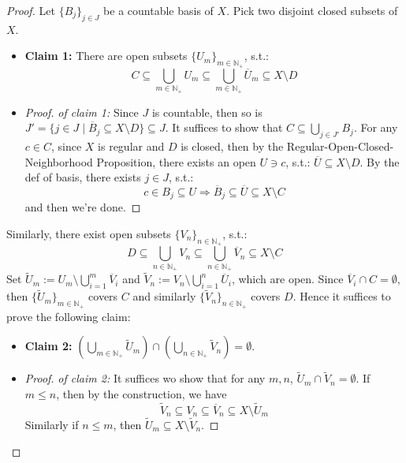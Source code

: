 \begin{proof}
    Let $\{B_j\}_{j \in J}$ be a countable basis of $X$. Pick two disjoint closed subsets of $X$.
    \begin{itemize}
        \item \textbf{Claim 1:} There are open subsets $\{U_m\}_{m \in \mathbb{N}_+}$, s.t.:
        $$C \subseteq \bigcup_{m \in \mathbb{N}_+} U_m \subseteq \bigcup_{m \in \mathbb{N}_+} \overline{U}_m \subseteq X \setminus D$$
        \item \begin{proof}
            \textit{of claim 1:} Since $J$ is countable, then so is $J'= \{j \in J \mid \overline{B}_j \subseteq X \setminus D\} \subseteq J$. It suffices to show that $C \subseteq \bigcup_{j \in J'} B_j$. For any $c \in C$, since $X$ is regular and $D$ is closed, then by the Regular-Open-Closed-Neighborhood Proposition, there exists an open $U \ni c$, s.t.: $\overline{U} \subseteq X\setminus D$. By the def of basis, there exists $j \in J$, s.t.:
            $$c \in B_j \subseteq U \Rightarrow \overline{B}_j \subseteq \overline{U} \subseteq X \setminus C$$
            and then we're done.
        \end{proof}
    \end{itemize}
    Similarly, there exist open subsets $\{ V_n\}_{n \in \mathbb{N}_+}$, s.t.:
    $$D \subseteq \bigcup_{n \in \mathbb{N}_+} V_n \subseteq \bigcup_{n \in \mathbb{N}_+} \overline{V}_n \subseteq X \setminus C$$
    Set $\tilde{U}_m:= U_m \setminus \bigcup_{i=1}^m \overline{V}_i$ and $\tilde{V}_n := V_n \setminus \bigcup_{i=1}^n \overline{U}_i$, which are open. Since $\overline{V}_i \cap C=\emptyset$, then $\{ \tilde{U}_m\}_{m \in \mathbb{N}_+}$ covers $C$ and similarly $\{\tilde{V}_n \}_{n \in \mathbb{N}_+}$ covers $D$. Hence it suffices to prove the following claim:
    \begin{itemize}
        \item \textbf{Claim 2:} $(\bigcup_{m \in \mathbb{N}_+} \tilde{U}_m) \cap (\bigcup_{n \in \mathbb{N}_+} \tilde{V}_n) =\emptyset$.
        \item \begin{proof}
            \textit{of claim 2:} It suffices wo show that for any $m,n$, $\tilde{U}_m \cap \tilde{V}_n = \emptyset$. If $m\leq n$, then by the construction, we have
            $$\tilde{V}_n \subseteq V_n \subseteq \overline{V}_n \subseteq X \setminus \tilde{U}_m$$
            Similarly if $n\leq m$, then $\tilde{U}_m \subseteq X \setminus \tilde{V}_n$.
        \end{proof}
    \end{itemize}
\end{proof}

